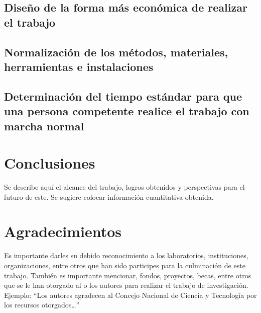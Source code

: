     \subsection{Diseño de la forma más económica de realizar el trabajo}
    
    \subsection{Normalización de los métodos, materiales, herramientas e instalaciones}
    
    \subsection{Determinación del tiempo estándar para que una persona competente realice el trabajo con marcha normal}
    
    
    \section{Conclusiones}
    
    Se describe aquí el alcance del trabajo, logros obtenidos y perspectivas para el futuro de este. Se sugiere colocar información cuantitativa obtenida.
    
    \section{Agradecimientos}
    
    Es importante darles su debido reconocimiento a los laboratorios, instituciones, organizaciones, entre otros que han sido participes para la culminación de este trabajo. También es importante mencionar, fondos, proyectos, becas, entre otros que se le han otorgado al o los autores para realizar el trabajo de investigación. Ejemplo: “Los autores agradecen al Concejo Nacional de Ciencia y Tecnología por los recursos otorgados…”
    
    
    
